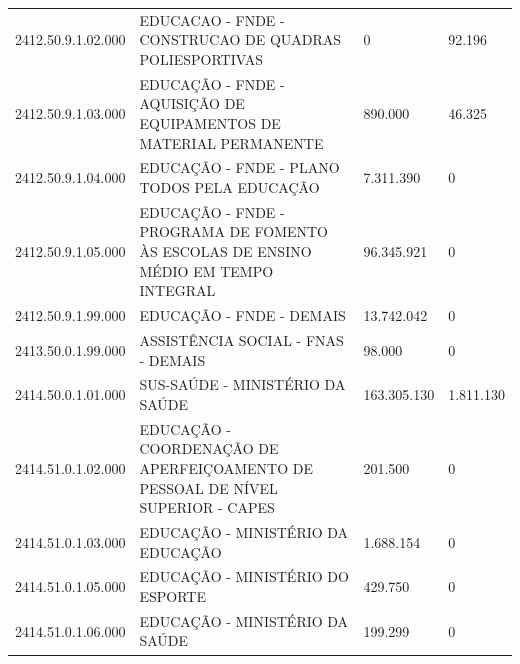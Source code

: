\documentclass{article}
\begin{document}
\begin{longtable}[c]{m{2cm}|m{11cm}|m{2cm}m{2cm}}
\multicolumn{1}{C{2cm}|}{2412.50.9.1.02.000} & \multicolumn{1}{L{11cm}|}{EDUCACAO - FNDE - CONSTRUCAO DE QUADRAS POLIESPORTIVAS} & \multicolumn{1}{R{2cm}|}{            0} & \multicolumn{1}{R{2cm}}{92.196} \\
\multicolumn{1}{C{2cm}|}{2412.50.9.1.03.000} & \multicolumn{1}{L{11cm}|}{EDUCAÇÃO - FNDE - AQUISIÇÃO DE EQUIPAMENTOS DE MATERIAL PERMANENTE} & \multicolumn{1}{R{2cm}|}{890.000} & \multicolumn{1}{R{2cm}}{46.325} \\
\multicolumn{1}{C{2cm}|}{2412.50.9.1.04.000} & \multicolumn{1}{L{11cm}|}{EDUCAÇÃO - FNDE - PLANO TODOS PELA EDUCAÇÃO} & \multicolumn{1}{R{2cm}|}{7.311.390} & \multicolumn{1}{R{2cm}}{            0} \\
\multicolumn{1}{C{2cm}|}{2412.50.9.1.05.000} & \multicolumn{1}{L{11cm}|}{EDUCAÇÃO - FNDE - PROGRAMA DE FOMENTO ÀS ESCOLAS DE ENSINO MÉDIO EM TEMPO INTEGRAL} & \multicolumn{1}{R{2cm}|}{96.345.921} & \multicolumn{1}{R{2cm}}{            0} \\
\multicolumn{1}{C{2cm}|}{2412.50.9.1.99.000} & \multicolumn{1}{L{11cm}|}{EDUCAÇÃO - FNDE - DEMAIS} & \multicolumn{1}{R{2cm}|}{13.742.042} & \multicolumn{1}{R{2cm}}{            0} \\
\multicolumn{1}{C{2cm}|}{2413.50.0.1.99.000} & \multicolumn{1}{L{11cm}|}{ASSISTÊNCIA SOCIAL - FNAS - DEMAIS} & \multicolumn{1}{R{2cm}|}{98.000} & \multicolumn{1}{R{2cm}}{            0} \\
\multicolumn{1}{C{2cm}|}{2414.50.0.1.01.000} & \multicolumn{1}{L{11cm}|}{SUS-SAÚDE - MINISTÉRIO DA SAÚDE} & \multicolumn{1}{R{2cm}|}{163.305.130} & \multicolumn{1}{R{2cm}}{1.811.130} \\
\multicolumn{1}{C{2cm}|}{2414.51.0.1.02.000} & \multicolumn{1}{L{11cm}|}{EDUCAÇÃO - COORDENAÇÃO DE APERFEIÇOAMENTO DE PESSOAL DE NÍVEL SUPERIOR - CAPES} & \multicolumn{1}{R{2cm}|}{201.500} & \multicolumn{1}{R{2cm}}{            0} \\
\multicolumn{1}{C{2cm}|}{2414.51.0.1.03.000} & \multicolumn{1}{L{11cm}|}{EDUCAÇÃO - MINISTÉRIO DA EDUCAÇÃO} & \multicolumn{1}{R{2cm}|}{1.688.154} & \multicolumn{1}{R{2cm}}{            0} \\
\multicolumn{1}{C{2cm}|}{2414.51.0.1.05.000} & \multicolumn{1}{L{11cm}|}{EDUCAÇÃO - MINISTÉRIO DO ESPORTE} & \multicolumn{1}{R{2cm}|}{429.750} & \multicolumn{1}{R{2cm}}{            0} \\
\multicolumn{1}{C{2cm}|}{2414.51.0.1.06.000} & \multicolumn{1}{L{11cm}|}{EDUCAÇÃO - MINISTÉRIO DA SAÚDE} & \multicolumn{1}{R{2cm}|}{199.299} & \multicolumn{1}{R{2cm}}{            0} \\

\end{longtable}
\end{document}

